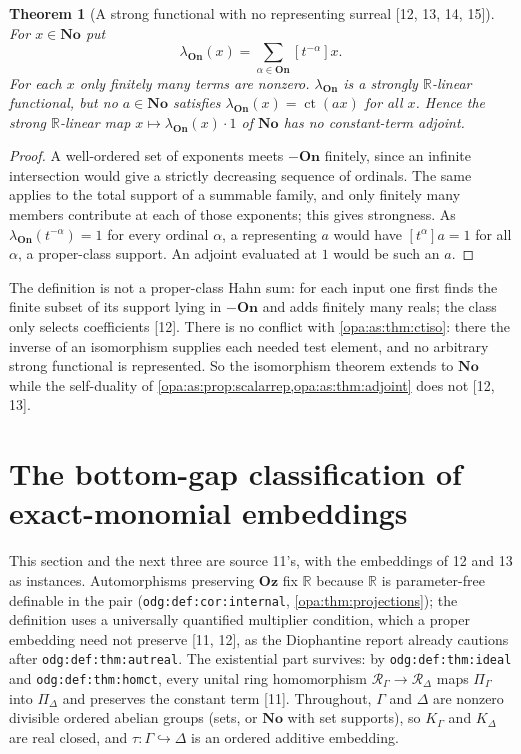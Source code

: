 \documentclass[11pt,oneside]{article}
\numberwithin{equation}{section}
\newtheorem{theorem}{Theorem}[section]
\theoremstyle{definition}
\theoremstyle{remark}
\newcommand{\No}{\mathbf{No}}
\newcommand{\Oz}{\mathbf{Oz}}
\newcommand{\R}{\mathbb R}
\newcommand{\ct}{\operatorname{ct}}
\newcommand{\coef}[2]{[t^{#1}]#2}
\newcommand{\src}[1]{\textup{\textsf{\small[#1]}}}
\newcommand{\lbl}[1]{\nolinkurl{#1}}
\newcommand{\On}{\mathbf{On}}
\begin{document}
\begin{theorem}[A strong functional with no representing surreal \src{12, 13, 14, 15}]\label{opa:as:thm:classdefect}
For $x\in\No$ put
\begin{equation}\label{opa:as:eq:classfunctional}
 \lambda_{\On}(x)=\sum_{\alpha\in\On}\coef{-\alpha}x .
\end{equation}
For each $x$ only finitely many terms are nonzero. $\lambda_{\On}$ is a strongly $\R$-linear
functional, but no $a\in\No$ satisfies $\lambda_{\On}(x)=\ct(ax)$ for all $x$. Hence the strong
$\R$-linear map $x\mapsto\lambda_{\On}(x)\cdot1$ of $\No$ has no constant-term adjoint.
\end{theorem}
\begin{proof}
A well-ordered set of exponents meets $-\On$ finitely, since an infinite intersection would give
a strictly decreasing sequence of ordinals. The same applies to the total support of a summable
family, and only finitely many members contribute at each of those exponents; this gives
strongness. As $\lambda_{\On}(t^{-\alpha})=1$ for every ordinal $\alpha$, a representing $a$ would
have $\coef\alpha a=1$ for all $\alpha$, a proper-class support. An adjoint evaluated at $1$ would
be such an $a$.
\end{proof}

The definition is not a proper-class Hahn sum: for each input one first finds the finite subset of
its support lying in $-\On$ and adds finitely many reals; the class only selects coefficients
\src{12}. There is no conflict with \cref{opa:as:thm:ctiso}: there the inverse of an isomorphism
supplies each needed test element, and no arbitrary strong functional is represented. So the
isomorphism theorem extends to $\No$ while the self-duality of
\cref{opa:as:prop:scalarrep,opa:as:thm:adjoint} does not \src{12, 13}.

\section{The bottom-gap classification of exact-monomial embeddings}\label{opa:as:sec:gap}

This section and the next three are source 11's, with the embeddings of 12 and 13 as
instances. Automorphisms preserving $\Oz$ fix $\R$ because $\R$ is parameter-free
definable in the pair (\lbl{odg:def:cor:internal}, \cref{opa:thm:projections}); the definition
uses a universally quantified multiplier condition, which a proper embedding need not preserve
\src{11, 12}, as the Diophantine report already cautions after \lbl{odg:def:thm:autreal}.
The existential part survives: by \lbl{odg:def:thm:ideal} and \lbl{odg:def:thm:homct}, every
unital ring homomorphism $\mathcal R_\Gamma\to\mathcal R_\Delta$ maps $\Pi_\Gamma$ into
$\Pi_\Delta$ and preserves the constant term \src{11}. Throughout, $\Gamma$ and $\Delta$ are
nonzero divisible ordered abelian groups (sets, or $\No$ with set supports), so $K_\Gamma$ and
$K_\Delta$ are real closed, and $\tau:\Gamma\hookrightarrow\Delta$ is an ordered additive
embedding.
\end{document}
